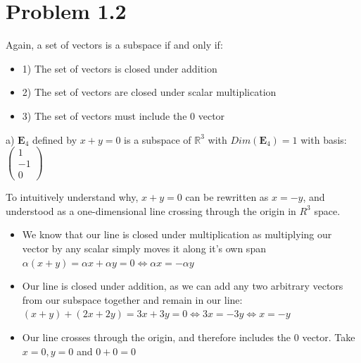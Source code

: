 \documentclass{article}
\begin{document}
\break

\section{Problem 1.2}

Again, a set of vectors is a subspace if and only if:
\begin{itemize}
    \item 1) The set of vectors is closed under addition
     \item 2) The set of vectors are closed under scalar multiplication
     \item 3) The set of vectors must include the {0} vector
\end{itemize} 

a) $\mathbf{E}_4$ defined by $x+y=0$ is a subspace of $\mathbb{R}^3$ with $Dim(\mathbf{E}_4)=1$ with basis: $\begin{pmatrix}
1\\
-1\\
0
\end{pmatrix}$ 
\par
To intuitively understand why, $x+y=0$ can be rewritten as $x = -y$, and understood as a one-dimensional line crossing through the origin in ${R}^3$ space.
\begin{itemize}
    \item We know that our line is closed under multiplication as multiplying our vector by any scalar simply moves it along it's own span
    \subitem $\alpha(x+y) = \alpha x + \alpha y = 0 \Longleftrightarrow \alpha x = -\alpha y$
    \item Our line is closed under addition, as we can add any two arbitrary vectors from our subspace together and remain in our line: 
    \subitem $(x+y) + (2x+2y) = 3x + 3y = 0 \Longleftrightarrow 3x = -3y \Longleftrightarrow x=-y$
    \item Our line crosses through the origin, and therefore includes the 0 vector. 
    \subitem Take $x=0,y=0$ and  $0+0=0$
\end{itemize}

\par
\end{document}

